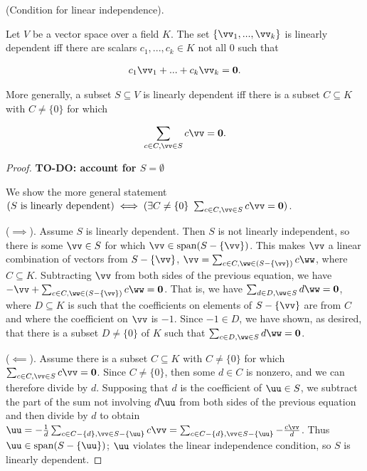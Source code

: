 \begin{theorem}
    (Condition for linear independence).
    
    Let $V$ be a vector space over a field $K$. The set $\{\vv_1, ..., \vv_k\}$ is linearly dependent iff there are scalars $c_1, ..., c_k \in K$ not all $0$ such that
    
    \begin{align*}
        c_1 \vv_1 + ... + c_k \vv_k = \mathbf{0}.
    \end{align*}
    
    More generally, a subset $S \subseteq V$ is linearly dependent iff there is a subset $C \subseteq K$ with $C \neq \{0\}$ for which
    
    \begin{align*}
        \sum_{c \in C, \vv \in S} c \vv = \mathbf{0}.
    \end{align*}
\end{theorem}

\begin{proof}
    \textbf{TO-DO: account for $S = \emptyset$}
     
   We show the more general statement $(\text{$S$ is linearly dependent}) \iff (\exists C \neq \{0\} \spc \sum_{c \in C, \vv \in S} c \vv = \mathbf{0})$.
   
   ($\implies$). Assume $S$ is linearly dependent. Then $S$ is not linearly independent, so there is some $\vv \in S$ for which $\vv \in \spann(S - \{\vv\})$. This makes $\vv$ a linear combination of vectors from $S - \{\vv\}$, $\vv = \sum_{c \in C, \ww \in (S - \{\vv\})} c \ww$, where $C \subseteq K$. Subtracting $\vv$ from both sides of the previous equation, we have $-\vv + \sum_{c \in C, \ww \in (S - \{\vv\})} c \ww = \mathbf{0}$. That is, we have $\sum_{d \in D, \ww \in S} d \ww = \mathbf{0}$, where $D \subseteq K$ is such that the coefficients on elements of $S - \{\vv\}$ are from $C$ and where the coefficient on $\vv$ is $-1$. Since $-1 \in D$, we have shown, as desired, that there is a subset $D \neq \{0\}$ of $K$ such that $\sum_{c \in D, \ww \in S} d \ww = \mathbf{0}$.
   
   ($\impliedby$). Assume there is a subset $C \subseteq K$ with $C \neq \{0\}$ for which $\sum_{c \in C, \vv \in S} c \vv = \mathbf{0}$. Since $C \neq \{0\}$, then some $d \in C$ is nonzero, and we can therefore divide by $d$. Supposing that $d$ is the coefficient of $\uu \in S$, we subtract the part of the sum not involving $d \uu$ from both sides of the previous equation and then divide by $d$ to obtain $\uu = -\frac{1}{d}\sum_{c \in C - \{d\}, \vv \in S - \{\uu\}} c \vv = \sum_{c \in C - \{d\}, \vv \in S - \{\uu\}} - \frac{c \vv}{d}$. Thus $\uu \in \spann(S - \{\uu\})$; $\uu$ violates the linear independence condition, so $S$ is linearly dependent.
\end{proof}

